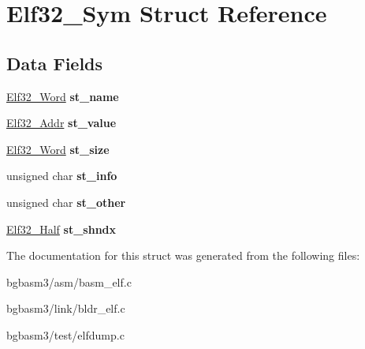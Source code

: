 \hypertarget{structElf32__Sym}{\section{Elf32\-\_\-\-Sym Struct Reference}
\label{structElf32__Sym}
}
\subsection*{Data Fields}
\begin{DoxyCompactItemize}
\item 
\hypertarget{structElf32__Sym_a6a972b30868879f8a1e071e0c45e5031}{\hyperlink{structElf32__Sword}{Elf32\-\_\-\-Word} {\bfseries st\-\_\-name}}\label{structElf32__Sym_a6a972b30868879f8a1e071e0c45e5031}

\item 
\hypertarget{structElf32__Sym_abf8ff76884bc5e2acb5f7eb42f733c2e}{\hyperlink{structElf32__Addr}{Elf32\-\_\-\-Addr} {\bfseries st\-\_\-value}}\label{structElf32__Sym_abf8ff76884bc5e2acb5f7eb42f733c2e}

\item 
\hypertarget{structElf32__Sym_a1b410e69fecd2610bc7e58d2b0245053}{\hyperlink{structElf32__Sword}{Elf32\-\_\-\-Word} {\bfseries st\-\_\-size}}\label{structElf32__Sym_a1b410e69fecd2610bc7e58d2b0245053}

\item 
\hypertarget{structElf32__Sym_a7d131c44ec48708b1c98f9b00ca9d528}{unsigned char {\bfseries st\-\_\-info}}\label{structElf32__Sym_a7d131c44ec48708b1c98f9b00ca9d528}

\item 
\hypertarget{structElf32__Sym_a2e1bf6bedb5180f74ea8cbaf9cedfd36}{unsigned char {\bfseries st\-\_\-other}}\label{structElf32__Sym_a2e1bf6bedb5180f74ea8cbaf9cedfd36}

\item 
\hypertarget{structElf32__Sym_a46e54847ab00fbea62df8ee5dff8dec6}{\hyperlink{structElf32__Half}{Elf32\-\_\-\-Half} {\bfseries st\-\_\-shndx}}\label{structElf32__Sym_a46e54847ab00fbea62df8ee5dff8dec6}

\end{DoxyCompactItemize}


The documentation for this struct was generated from the following files\-:\begin{DoxyCompactItemize}
\item 
bgbasm3/asm/basm\-\_\-elf.\-c\item 
bgbasm3/link/bldr\-\_\-elf.\-c\item 
bgbasm3/test/elfdump.\-c\end{DoxyCompactItemize}
